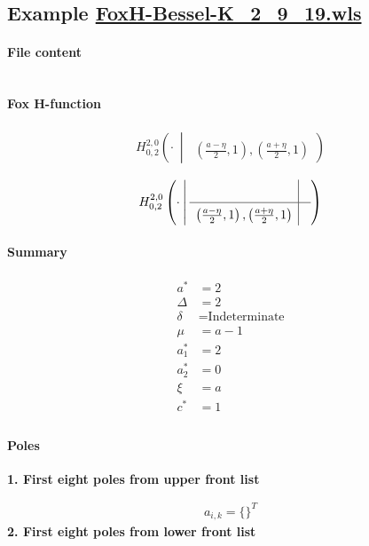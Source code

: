 \documentclass[preview]{standalone}
\newcommand{\FoxH}[5]{H_{#2}^{#1}\left(#3\:\middle\vert\: \begin{array}{l}#4\\[0.4em] #5\end{array}\right)}
\begin{document}
\subsection{Example \url{FoxH-Bessel-K_2_9_19.wls}}

\paragraph{File content}

\inputminted{text}{../Examples/FoxH-Bessel-K_2_9_19.wls}

\paragraph{Fox H-function}

\begin{align*}
  \FoxH
    {2,0}
    {0,2}
    {\cdot}
    {}
    {\left(\frac{a-\eta }{2}, 1\right), \left(\frac{a+\eta }{2}, 1\right)}
\end{align*}

\begin{align*}
  \FoxHext
    {2,0}
    {0,2}
    {\cdot}
    {}
    {}
    {\left(\frac{a-\eta }{2}, 1\right), \left(\frac{a+\eta }{2}, 1\right)}
    {}
\end{align*}

\paragraph{Summary}

\begin{align*}
  a^*    & = 2 \\
  \Delta & = 2 \\
  \delta & = \text{Indeterminate} \\
  \mu    & = a-1 \\
  a_1^*  & = 2 \\
  a_2^*  & = 0 \\
  \xi    & = a \\
  c^*    & = 1 \\
\end{align*}

\paragraph{Poles}

\noindent\textbf{1. First eight poles from upper front list}

\begin{align*}
  a_{i,k} = 
  \{\}^T 
\end{align*}
\noindent\textbf{2. First eight poles from lower front list}
\end{document}
